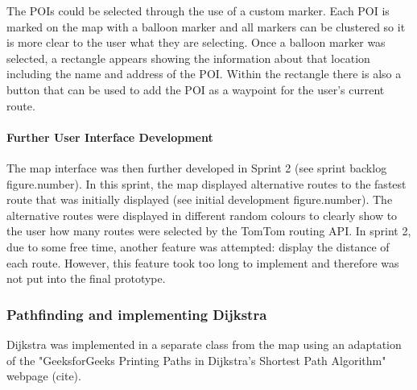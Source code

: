 \documentclass[12pt,a4paper]{article}
\begin{document}
 The POIs could be selected through the use of a custom marker. Each POI is marked on the map with a balloon marker and all markers can be clustered so it is more clear to the user what they are selecting. Once a balloon marker was selected, a rectangle appears showing the information about that location including the name and address of the POI. Within the rectangle there is also a button that can be used to add the POI as a waypoint for the user's current route.

\paragraph{Further User Interface Development}
The map interface was then further developed in Sprint 2 (see sprint backlog figure.number). In this sprint, the map displayed alternative routes to the fastest route that was initially displayed (see initial development figure.number). The alternative routes were displayed in different random colours to clearly show to the user how many routes were selected by the TomTom routing API. In sprint 2, due to some free time, another feature was attempted: display the distance of each route. However, this feature took too long to implement and therefore was not put into the final prototype.

\subsubsection{Pathfinding and implementing Dijkstra}
Dijkstra was implemented in a separate class from the map using an adaptation of the "GeeksforGeeks Printing Paths in Dijkstra's Shortest Path Algorithm" webpage (cite). 
\end{document}
